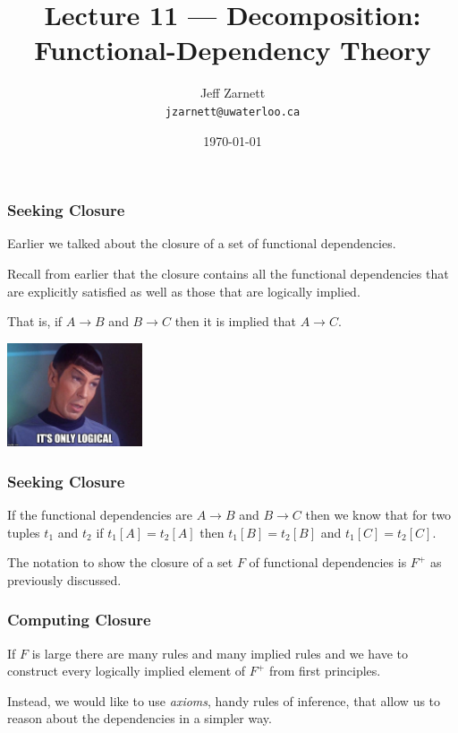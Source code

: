 

\title{Lecture  11 --- Decomposition: Functional-Dependency Theory }

\author{Jeff Zarnett \\ \small \texttt{jzarnett@uwaterloo.ca}}
\date{\today}




\begin{frame}
  \titlepage

 \end{frame}



\begin{frame}
\frametitle{Seeking Closure}

Earlier we talked about the closure of a set of functional dependencies. 

Recall from earlier that the closure contains all the functional dependencies that are explicitly satisfied as well as those that are logically implied. 

That is, if $A \rightarrow B$ and $B \rightarrow C$ then it is implied that $A \rightarrow C$.

\begin{center}
	\includegraphics[width=0.3\textwidth]{images/logical.jpg}
\end{center}

\end{frame}



\begin{frame}
\frametitle{Seeking Closure}
If the functional dependencies are $A \rightarrow B$ and $B \rightarrow C$ then we know that for two tuples $t_{1}$ and $t_{2}$ if $t_{1}[A] = t_{2}[A]$ then $t_{1}[B] = t_{2}[B]$ and $t_{1}[C] = t_{2}[C]$. 

The notation to show the closure of a set $F$ of functional dependencies is $F^{+}$ as previously discussed.

\end{frame}


\begin{frame}
\frametitle{Computing Closure}

If $F$ is large there are many rules and many implied rules and we have to construct every logically implied element of $F^{+}$ from first principles. 

Instead, we would like to use \textit{axioms}, handy rules of inference, that allow us to reason about the dependencies in a simpler way. 


\end{frame}


